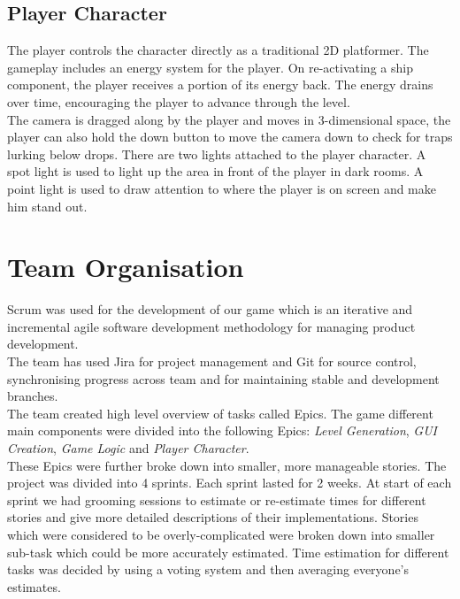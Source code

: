 \documentclass[11pt]{article}
\begin{document}
\subsection{Player Character}
The player controls the character directly as a traditional 2D platformer. The gameplay includes an energy system for the player. On re-activating a ship component, the player receives a portion of its energy back. The energy drains over time, encouraging the player to advance through the level.\\

The camera is dragged along by the player and moves in 3-dimensional space, the player can also hold the down button to move the camera down to check for traps lurking below drops. There are two lights attached to the player character. A spot light is used to light up the area in front of the player in dark rooms. A point light is used to draw attention to where the player is on screen and make him stand out.
\section{Team Organisation}
Scrum was used for the development of our game which is an iterative and incremental agile software development methodology for managing product development.\\

The team has used Jira for project management and Git for source control, synchronising progress across team and for maintaining stable and development branches.\\

The team created high level overview of tasks called Epics. The game different main components were divided into the following Epics: \textit{Level Generation}, \textit{GUI Creation}, \textit{Game Logic} and \textit{Player Character}.\\

These Epics were further broke down into smaller, more manageable stories. The project was divided into 4 sprints. Each sprint lasted for 2 weeks. At start of each sprint we had grooming sessions to estimate or re-estimate times for different stories and give more detailed descriptions of their implementations. Stories which were considered to be overly-complicated were broken down into smaller sub-task which could be more accurately estimated. Time estimation for different tasks was decided by using a voting system and then averaging everyone's estimates.\\
\end{document}
